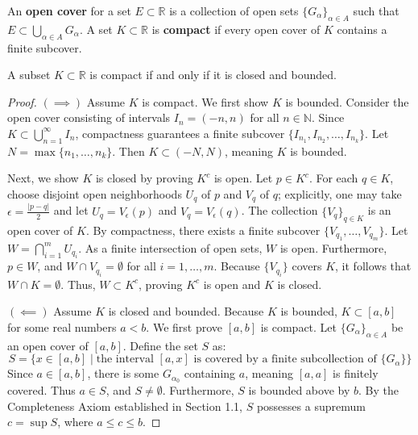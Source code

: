 \begin{definition}
An \textbf{open cover} for a set $E \subset \mathbb{R}$ is a collection of open sets $\{G_\alpha\}_{\alpha \in A}$ such that $E \subset \bigcup_{\alpha \in A} G_\alpha$. A set $K \subset \mathbb{R}$ is \textbf{compact} if every open cover of $K$ contains a finite subcover.
\end{definition}

\begin{theorem}
A subset $K \subset \mathbb{R}$ is compact if and only if it is closed and bounded.
\end{theorem}

\begin{proof}
$(\implies)$ Assume $K$ is compact. We first show $K$ is bounded. Consider the open cover consisting of intervals $I_n = (-n, n)$ for all $n \in \mathbb{N}$. Since $K \subset \bigcup_{n=1}^\infty I_n$, compactness guarantees a finite subcover $\{I_{n_1}, I_{n_2}, \dots, I_{n_k}\}$. Let $N = \max\{n_1, \dots, n_k\}$. Then $K \subset (-N, N)$, meaning $K$ is bounded.

Next, we show $K$ is closed by proving $K^c$ is open. Let $p \in K^c$. For each $q \in K$, choose disjoint open neighborhoods $U_q$ of $p$ and $V_q$ of $q$; explicitly, one may take $\epsilon = \frac{|p-q|}{2}$ and let $U_q = V_\epsilon(p)$ and $V_q = V_\epsilon(q)$. The collection $\{V_q\}_{q \in K}$ is an open cover of $K$. By compactness, there exists a finite subcover $\{V_{q_1}, \dots, V_{q_m}\}$. Let $W = \bigcap_{i=1}^m U_{q_i}$. As a finite intersection of open sets, $W$ is open. Furthermore, $p \in W$, and $W \cap V_{q_i} = \emptyset$ for all $i = 1, \dots, m$. Because $\{V_{q_i}\}$ covers $K$, it follows that $W \cap K = \emptyset$. Thus, $W \subset K^c$, proving $K^c$ is open and $K$ is closed.

$(\impliedby)$ Assume $K$ is closed and bounded. Because $K$ is bounded, $K \subset [a, b]$ for some real numbers $a < b$. We first prove $[a, b]$ is compact. Let $\{G_\alpha\}_{\alpha \in A}$ be an open cover of $[a, b]$. Define the set $S$ as:
\[
S = \{ x \in [a, b] \mid \text{the interval } [a, x] \text{ is covered by a finite subcollection of } \{G_\alpha\} \}
\]
Since $a \in [a, b]$, there is some $G_{\alpha_0}$ containing $a$, meaning $[a, a]$ is finitely covered. Thus $a \in S$, and $S \neq \emptyset$. Furthermore, $S$ is bounded above by $b$. By the Completeness Axiom established in Section 1.1, $S$ possesses a supremum $c = \sup S$, where $a \le c \le b$.


\end{proof}
